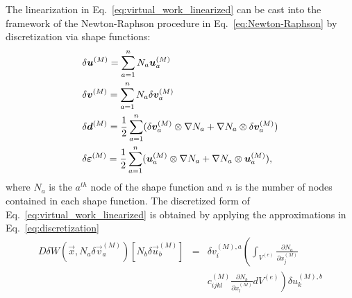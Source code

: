 The linearization in Eq.\ \eqref{eq:virtual_work_linearized} can be cast into the framework of the Newton-Raphson procedure in Eq.\ \eqref{eq:Newton-Raphson} by discretization via shape functions:
%
\begin{align}
&\delta \vec{u}^{(M)} = \sum_{a=1}^n N_a \vec{u}_a^{(M)} \nonumber\\
%
&\delta \vec{v}^{(M)} = \sum_{a=1}^n N_a \delta \vec{v}_a^{(M)} \nonumber\\
%
&\delta \vec{d}^{(M)} = \frac{1}{2} \sum_{a=1}^n (\delta \vec{v}_a^{(M)} \otimes \nabla N_a + \nabla N_a \otimes \delta \vec{v}_a^{(M)}) \nonumber\\
%
&\delta \mat{\varepsilon}^{(M)} = \frac{1}{2} \sum_{a=1}^n (\vec{u}_a^{(M)} \otimes \nabla N_a + \nabla N_a \otimes \vec{u}_a^{(M)}),
\label{eq:discretization}
\end{align}
%
where $N_a$ is the $a^{th}$ node of the shape function and $n$ is the number of nodes contained in each shape function. The discretized form of Eq.\ \eqref{eq:virtual_work_linearized} is obtained by applying the approximations in Eq.\ \eqref{eq:discretization} 
%
\begin{eqnarray}
D\delta W(\vec{x},N_a\delta \vec{v}_a^{(M)})[N_b\delta \vec{u}_b^{(M)}] &=&\delta v_i^{(M),a}\left(\int_{V^{(e)}}\frac{\partial N_a}{\partial x_j^{(M)}} \right.\nonumber\\
&&\left.c_{ijkl}^{(M)} \frac{\partial N_b}{\partial x_l^{(M)}} dV^{(e)} \right) \delta u_k^{(M),b} 
\end{eqnarray}
%

